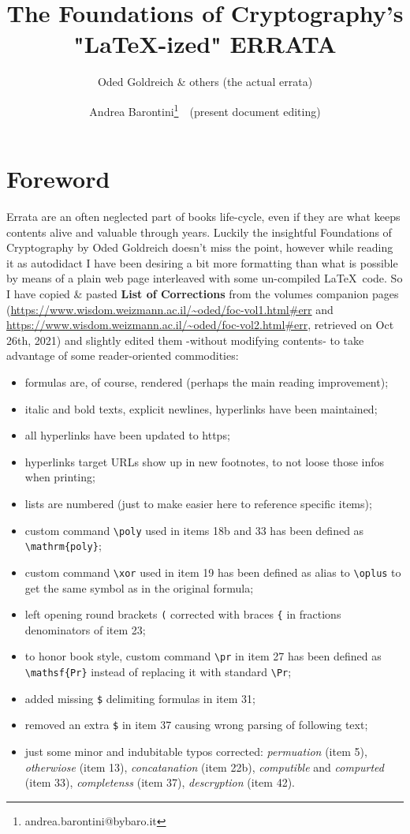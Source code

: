 \documentclass[10pt,a4paper]{article}
\title{The Foundations of Cryptography's \\ "\LaTeX-ized" ERRATA}
\author{
	Oded Goldreich \& others (the actual errata)
	\and
	Andrea Barontini\thanks{andrea.barontini@bybaro.it}\ \ (present document editing)
}
\newcommand{\poly}{\mathrm{poly}}
\newcommand{\xor}{\oplus}
\newcommand{\pr}{\mathsf{Pr}}
\begin{document}
\maketitle

\section{Foreword}
Errata are an often neglected part of books life-cycle, even if they are what keeps contents alive and valuable through years. Luckily the insightful Foundations of Cryptography by Oded Goldreich doesn't  miss the point, however while reading it as autodidact I have been desiring a bit more formatting than what is possible by means of a plain web page interleaved with some un-compiled \LaTeX\ code. So I have copied \& pasted \textbf{List of Corrections} from the volumes companion pages (\href{https://www.wisdom.weizmann.ac.il/~oded/foc-vol1.html#err}{\textsf{https://www.wisdom.weizmann.ac.il/\textasciitilde oded/foc-vol1.html\#err}} and \href{https://www.wisdom.weizmann.ac.il/~oded/foc-vol2.html#err}{\textsf{https://www.wisdom.weizmann.ac.il/\textasciitilde oded/foc-vol2.html\#err}}, retrieved on Oct 26th, 2021) and slightly edited them -without modifying contents- to take advantage of some reader-oriented commodities:
\begin{itemize}
	\item formulas are, of course, rendered (perhaps the main reading improvement);
	\item italic and bold texts, explicit newlines, hyperlinks have been maintained;
	\item all hyperlinks have been updated to https;
	\item hyperlinks target URLs show up in new footnotes, to not loose those infos when printing;
	\item lists are numbered (just to make easier here to reference specific items);
	\item custom command \verb|\poly| used in items 18b and 33 has been defined as \verb|\mathrm{poly}|;
	\item custom command \verb|\xor| used in item 19 has been defined as alias to \verb*|\oplus| to get the same symbol as in the original formula;
	\item left opening round brackets \verb*|(| corrected with braces \verb|{| in fractions denominators of item 23;
	\item to honor book style, custom command \verb|\pr| in item 27 has been defined as \verb|\mathsf{Pr}| instead of replacing it with standard \verb|\Pr|;
	\item added missing \verb*|$| delimiting formulas in item 31;
	\item removed an extra \verb|$| in item 37 causing wrong parsing of following text;
	\item just some minor and indubitable typos corrected: \textit{permuation} (item 5), \textit{otherwiose} (item 13), \textit{concatanation} (item 22b), \textit{computible} and \textit{compurted} (item 33), \textit{completenss} (item 37), \textit{descryption} (item 42).
\end{itemize}
\end{document}
